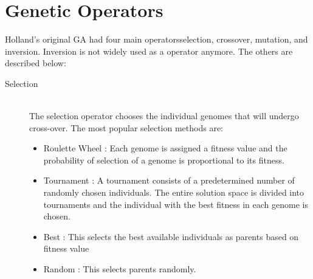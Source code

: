     
\section{Genetic Operators} \label{sec:operators}

Holland's original GA had four main operators\textemdash selection, crossover, mutation, and inversion. Inversion is not widely used as a operator anymore. The others are described below:

\begin{description}
  \item[Selection] \hfill \\
	The selection operator chooses the individual genomes that will undergo cross-over. The most popular selection methods are:
	\begin{itemize}
	\item Roulette Wheel : Each genome is assigned a fitness value and the probability of selection of a genome is proportional to its fitness. 
	\item Tournament : A tournament consists of a predetermined number of randomly chosen individuals. The entire solution space is divided into tournaments and the individual with the best fitness in each genome is chosen.
	\item Best : This selects the best available individuals as parents based on fitness value
	\item Random : This selects parents randomly.
	\end{itemize}
  

\end{description}
